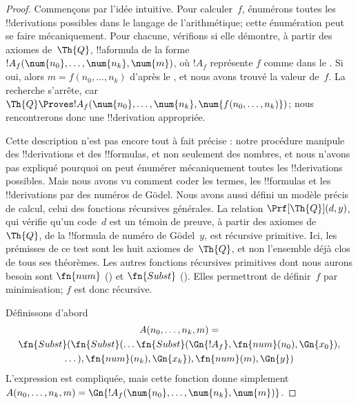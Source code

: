 \documentclass[../../../include/open-logic-section]{subfiles}
\begin{document}
\begin{proof}
Commençons par l'idée intuitive. Pour calculer~$f$, énumérons
toutes les !!{derivation}s possibles dans le langage de
l'arithmétique; cette énumération peut se faire mécaniquement.
Pour chacune, vérifions si elle démontre, à partir des axiomes
de~$\Th{Q}$, !!a{formula} de la forme
$!A_f(\num{n_0},\dots,\num{n_k},\num{m})$, où $!A_f$ représente
$f$ comme dans le . Si oui, alors
$m=f(n_0,\dots,n_k)$ d'après le , et nous avons
trouvé la valeur de~$f$. La recherche s'arrête, car
$\Th{Q} \Proves !A_f(\num{n_0},\dots,\num{n_k},
\num{f(n_0,\dots,n_k)})$; nous rencontrerons donc une
!!{derivation} appropriée.

Cette description n'est pas encore tout à fait précise : notre
procédure manipule des !!{derivation}s et des !!{formula}s, et
non seulement des nombres, et nous n'avons pas expliqué pourquoi
on peut énumérer mécaniquement toutes les !!{derivation}s
possibles. Mais nous avons vu comment coder les termes, les
!!{formula}s et les !!{derivation}s par des numéros de G\"odel.
Nous avons aussi défini un modèle précis de calcul, celui des
fonctions récursives générales. La relation
$\Prf[\Th{Q}](d,y)$, qui vérifie qu'un code~$d$ est un témoin de
preuve, à partir des axiomes de~$\Th{Q}$, de la !!{formula} de
numéro de G\"odel~$y$, est récursive primitive. Ici, les
prémisses de ce test sont les huit axiomes de~$\Th{Q}$, et non
l'ensemble déjà clos de tous ses théorèmes. Les autres fonctions
récursives primitives dont nous aurons besoin sont $\fn{num}$
() et $\fn{Subst}$
(). Elles permettront de
définir~$f$ par minimisation; $f$ est donc récursive.

Définissons d'abord
\begin{multline*}
  A(n_0, \dots, n_k, m) = \\
  \fn{Subst}(\fn{Subst}(\dots\fn{Subst}(\Gn{!A_f}, \fn{num}(n_0), \Gn{x_0}),\\ \dots),
  \fn{num}(n_k),  \Gn{x_k}), \fn{num}(m), \Gn{y})
\end{multline*}
L'expression est compliquée, mais cette fonction donne simplement
$A(n_0,\dots,n_k,m)=\Gn{!A_f(\num{n_0},\dots,\num{n_k},\num{m})}$.


\end{proof}
\end{document}

